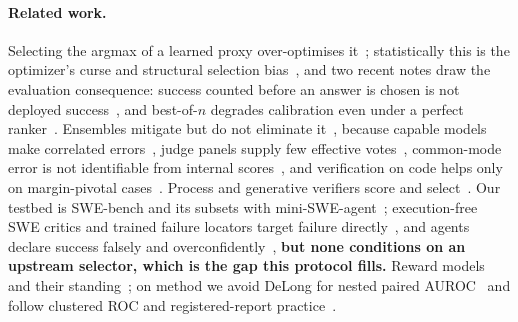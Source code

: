 \documentclass[10pt]{article}
\begin{document}
\paragraph{Related work.}
Selecting the argmax of a learned proxy over-optimises it~\citep{gao2023scaling,khalaf2025inference,stroebl2024inference,yu2026caution}; statistically this is the optimizer's curse and structural selection bias~\citep{smith2006optimizer,hernan2004structural}, and two recent notes draw the evaluation consequence: success counted before an answer is chosen is not deployed success~\citep{emadi2026scaling}, and best-of-$n$ degrades calibration even under a perfect ranker~\citep{trilemma2026}. Ensembles mitigate but do not eliminate it~\citep{eisenstein2023helping,coste2023reward}, because capable models make correlated errors~\citep{goel2025great,kim2025correlated}, judge panels supply few effective votes~\citep{kohli2026nine,hossain2026agreement}, common-mode error is not identifiable from internal scores~\citep{afrin2026ensembles}, and verification on code helps only on margin-pivotal cases~\citep{shu2026pivotal}. Process and generative verifiers score and select~\citep{lightman2023verify,zhang2024genrm}. Our testbed is SWE-bench and its subsets with mini-SWE-agent~\citep{jimenez2024swebench,swebenchverified2024,yang2025multilingual,miniswe2025}; execution-free SWE critics and trained failure locators target failure directly~\citep{yadavally2025critics,shum2025swerm,rahman2026scout,wang2026failfast}, and agents declare success falsely and overconfidently~\citep{advani2026silent}, \textbf{but none conditions on an upstream selector, which is the gap this protocol fills.} Reward models and their standing~\citep{liu2025skywork2,yang2024grm,zeng2025acecoder,lambert2024rewardbench}; on method we avoid DeLong for nested paired AUROC~\citep{demler2012misuse} and follow clustered ROC and registered-report practice~\citep{obuchowski1997nonparametric,nosek2018preregistration,chambers2022registered}.
\end{document}
